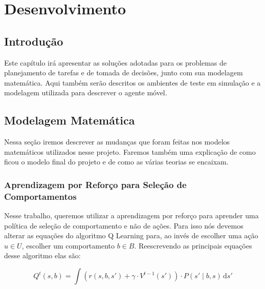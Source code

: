 


\chapter{Desenvolvimento} \label{chap:Desenvolvimento}


\section{Introdução}

Este capítulo irá apresentar as soluções adotadas para os problemas de planejamento de tarefas e de tomada de decisões, junto com sua modelagem matemática. Aqui também serão descritos os ambientes de teste em simulação e a modelagem utilizada para descrever o agente móvel.

\section{Modelagem Matemática}

Nessa seção iremos descrever as mudanças que foram feitas nos modelos matemáticos utilizados nesse projeto. Faremos também uma explicação de como ficou o modelo final do projeto e de como as várias teorias se encaixam.

\subsection{Aprendizagem por Reforço para Seleção de Comportamentos} \label{subsection:QLearningSelecaoDeComportamento}

Nesse trabalho, queremos utilizar a aprendizagem por reforço para aprender uma política de seleção de comportamento e não de ações. Para isso nós devemos alterar as equações do algoritmo Q Learning para, ao invés de escolher uma ação $ u \in U $, escolher um comportamento $ b \in B $. Reescrevendo as principais equações desse algoritmo elas são:

\begin{equation} \label{equation:QValueFunctionBehavior}
    Q^t \left( s, b \right) = \int \! \left( r \left( s, b, s' \right) + \gamma \cdot V^{t-1} \left( s' \right) \right) \cdot P \left( s' \mid b, s \right) \, \mathrm{d}s'
\end{equation}


